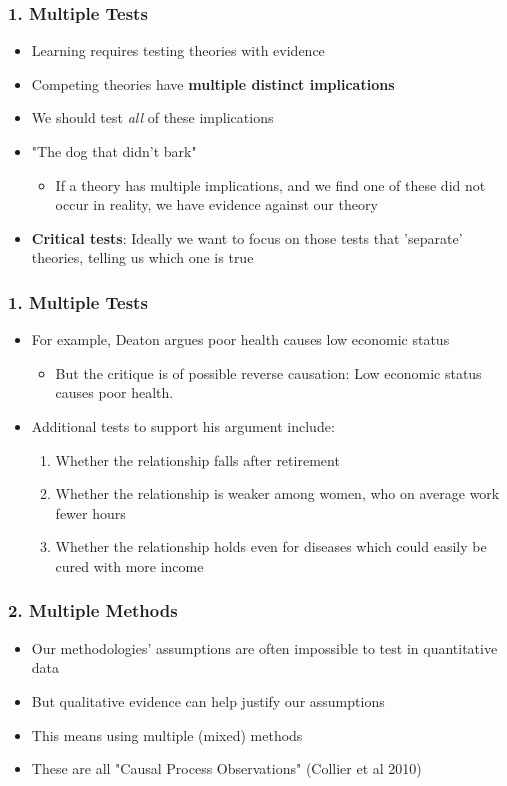 \documentclass[xcolor=x11names,compress]{beamer}\usepackage[]{graphicx}\usepackage[]{color}
\renewcommand{\(}{\begin{columns}}
\renewcommand{\)}{\end{columns}}
\newcommand{\<}[1]{\begin{column}{#1}}
\renewcommand{\>}{\end{column}}
\begin{document}
\begin{frame}
\frametitle{1. Multiple Tests}
\begin{itemize}
\item Learning requires testing theories with evidence
\pause
\item Competing theories have \textbf{multiple distinct implications}
\pause
\item We should test \textit{all} of these implications
\item "The dog that didn't bark"
\pause
\begin{itemize}
\item If a theory has multiple implications, and we find one of these did not occur in reality, we have evidence against our theory
\pause
\end{itemize}
\item \textbf{Critical tests}: Ideally we want to focus on those tests that 'separate' theories, telling us which one is true
\end{itemize}
\end{frame}

\begin{frame}
\frametitle{1. Multiple Tests}
\begin{itemize}
\item For example, Deaton argues poor health causes low economic status
\pause
\begin{itemize}
\item But the critique is of possible reverse causation: Low economic status causes poor health.
\pause
\end{itemize}
\item Additional tests to support his argument include:
\pause
\begin{enumerate}
\item Whether the relationship falls after retirement
\pause
\item Whether the relationship is weaker among women, who on average work fewer hours
\pause
\item Whether the relationship holds even for diseases which could easily be cured with more income
\end{enumerate}
\end{itemize}
\end{frame}

\begin{frame}
\frametitle{2. Multiple Methods}
\begin{itemize}
\item Our methodologies' assumptions are often impossible to test in quantitative data
\pause
\item But qualitative evidence can help justify our assumptions
\pause
\item This means using multiple (mixed) methods
\pause
\item These are all "Causal Process Observations" (Collier et al 2010)
\end{itemize}
\end{frame}
\end{document}
